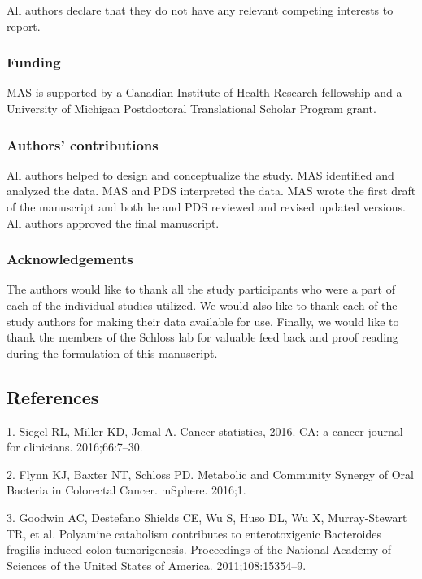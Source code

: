 \documentclass[12pt,]{article}
\begin{document}
All authors declare that they do not have any relevant competing
interests to report.

\subsubsection{Funding}\label{funding}

MAS is supported by a Canadian Institute of Health Research fellowship
and a University of Michigan Postdoctoral Translational Scholar Program
grant.

\subsubsection{Authors' contributions}\label{authors-contributions}

All authors helped to design and conceptualize the study. MAS identified
and analyzed the data. MAS and PDS interpreted the data. MAS wrote the
first draft of the manuscript and both he and PDS reviewed and revised
updated versions. All authors approved the final manuscript.

\subsubsection{Acknowledgements}\label{acknowledgements}

The authors would like to thank all the study participants who were a
part of each of the individual studies utilized. We would also like to
thank each of the study authors for making their data available for use.
Finally, we would like to thank the members of the Schloss lab for
valuable feed back and proof reading during the formulation of this
manuscript.

\newpage

\subsection{References}\label{references}

\hypertarget{refs}{}
\hypertarget{ref-siegel_cancer_2016}{}
1. Siegel RL, Miller KD, Jemal A. Cancer statistics, 2016. CA: a cancer
journal for clinicians. 2016;66:7--30.

\hypertarget{ref-flynn_metabolic_2016}{}
2. Flynn KJ, Baxter NT, Schloss PD. Metabolic and Community Synergy of
Oral Bacteria in Colorectal Cancer. mSphere. 2016;1.

\hypertarget{ref-goodwin_polyamine_2011}{}
3. Goodwin AC, Destefano Shields CE, Wu S, Huso DL, Wu X, Murray-Stewart
TR, et al. Polyamine catabolism contributes to enterotoxigenic
Bacteroides fragilis-induced colon tumorigenesis. Proceedings of the
National Academy of Sciences of the United States of America.
2011;108:15354--9.
\end{document}
